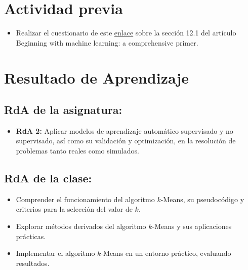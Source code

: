 \documentclass[a4,11pt]{aleph-notas}
\begin{document}
\encabezado

\section*{Actividad previa}

\begin{itemize}
    \item Realizar el cuestionario de este \href{https://gemini.google.com/share/475317ea89c6}{enlace} sobre la sección 12.1 del artículo Beginning with machine learning: a comprehensive primer.
\end{itemize}

\section*{Resultado de Aprendizaje}

\subsection*{RdA de la asignatura:}
\begin{itemize}[leftmargin=*]
    \item \textbf{RdA 2:} Aplicar modelos de aprendizaje automático supervisado y no supervisado, así como su validación y optimización, en la resolución de problemas tanto reales como simulados.
\end{itemize}

\subsection*{RdA de la clase:}
\begin{itemize}[leftmargin=*]
    \item Comprender el funcionamiento del algoritmo $k$-Means, su pseudocódigo y criterios para la selección del valor de $k$.
    \item Explorar métodos derivados del algoritmo $k$-Means y sus aplicaciones prácticas.
    \item Implementar el algoritmo $k$-Means en un entorno práctico, evaluando resultados.
\end{itemize}

\end{document}
